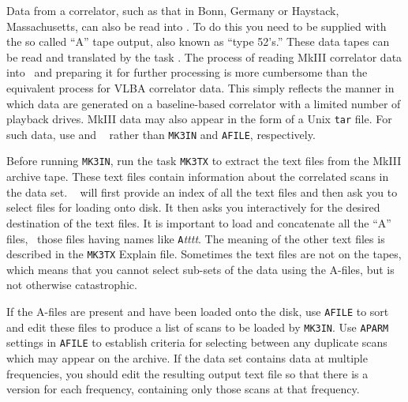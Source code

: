 Data from a  correlator, such as that in Bonn, Germany or
Haystack, Massachusetts, can also be read into \AIPS\@.  To do this
you need to be supplied with the so called ``A'' tape output, also
known as ``type 52's.''  These data tapes can be read and translated
by the task {\tt {}}\@.  The process of reading MkIII
correlator data into \AIPS\ and preparing it for further processing is
more cumbersome than the equivalent process for VLBA correlator data.
This simply reflects the manner in which data are generated on a
baseline-based correlator with a limited number of playback
drives.  MkIII data may also appear in the form of a Unix
{\tt tar} file.  For such data, use {\tt {}} and {\tt
{}} rather than {\tt MK3IN} and {\tt AFILE}, respectively.

Before running {\tt MK3IN}, run the task {\tt MK3TX} to extract
the text files from the MkIII archive tape.  These text files contain
information about the correlated scans in the data set. {\tt
{}} will first provide an index of all the text files and
then ask you to select files for loading onto disk.  It then asks you
interactively for the desired destination of the text files.  It is
important to load and concatenate all the ``A'' files, \ie\ those
files having names like {\tt A}{\it tttt\/}.  The meaning of the other
text files is described in the {\tt MK3TX} Explain file.  Sometimes
the text files are not on the tapes, which means that you cannot
select sub-sets of the data using the A-files, but is not otherwise
catastrophic.

If the A-files are present and have been loaded onto the disk, use
{\tt AFILE} to sort and edit these files to produce a list of scans to
be loaded by {\tt MK3IN}\@.  Use {\tt APARM} settings in {\tt AFILE}
to establish criteria for selecting between any duplicate scans which
may appear on the archive.  If the data set contains data at multiple
frequencies, you should edit the resulting output text file so that
there is a version for each frequency, containing only those scans at
that frequency.

